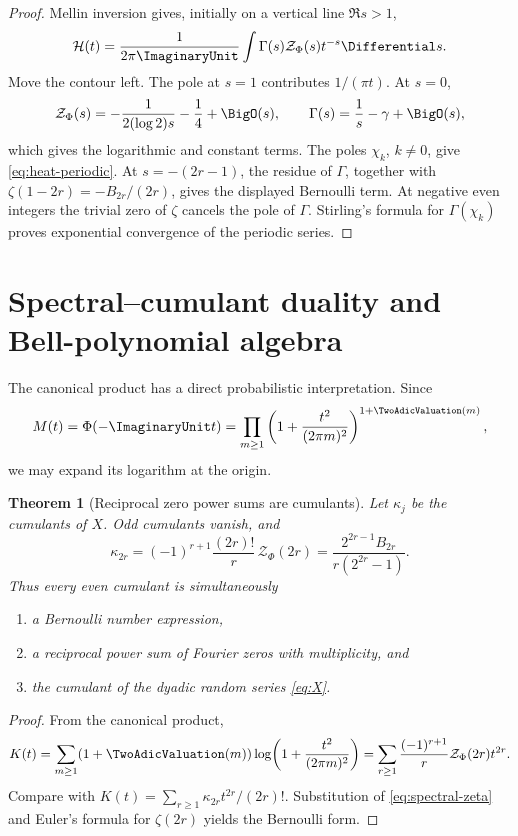 \documentclass[11pt,oneside]{article}
\newtheorem{theorem}{Theorem}[section]
\theoremstyle{definition}
\theoremstyle{remark}
\begin{document}
\begin{proof}
Mellin inversion gives, initially on a vertical line \(\Re s>1\),
\[
 \mathcal H(t)
 =\frac1{2\pi\ImaginaryUnit}\int
   \Gamma(s)\mathcal Z_\Phi(s)t^{-s}\Differential s.
\]
Move the contour left.  The pole at \(s=1\) contributes \(1/(\pi t)\).
At \(s=0\),
\[
 \mathcal Z_\Phi(s)
 =-\frac1{2(\log2)s}-\frac14+\BigO(s),
 \qquad
 \Gamma(s)=\frac1s-\gamma+\BigO(s),
\]
which gives the logarithmic and constant terms.  The poles
\(\chi_k\), \(k\neq0\), give \eqref{eq:heat-periodic}.  At
\(s=-(2r-1)\), the residue of \(\Gamma\), together with
\(\zeta(1-2r)=-B_{2r}/(2r)\), gives the displayed Bernoulli term.  At
negative even integers the trivial zero of \(\zeta\) cancels the pole of
\(\Gamma\).  Stirling's formula for \(\Gamma(\chi_k)\) proves exponential
convergence of the periodic series.
\end{proof}

\section{Spectral--cumulant duality and Bell-polynomial algebra}

The canonical product has a direct probabilistic interpretation.  Since
\[
 M(t)=\Phi(-\ImaginaryUnit t)
 =\prod_{m\geq1}
  \left(1+\frac{t^2}{(2\pi m)^2}\right)^{1+\TwoAdicValuation(m)},
\]
we may expand its logarithm at the origin.

\begin{theorem}[Reciprocal zero power sums are cumulants]
\label{thm:cumulants}
Let \(\kappa_j\) be the cumulants of \(X\).  Odd cumulants vanish, and
\begin{equation}
 \boxed{\displaystyle
 \kappa_{2r}
 =(-1)^{r+1}\frac{(2r)!}{r}\,
  \mathcal Z_\Phi(2r)
 =\frac{2^{2r-1}B_{2r}}{r(2^{2r}-1)}.}
 \label{eq:cumulants}
\end{equation}
Thus every even cumulant is simultaneously
\begin{enumerate}[label=(\roman*),leftmargin=2.5em]
\item a Bernoulli number expression,
\item a reciprocal power sum of Fourier zeros with multiplicity, and
\item the cumulant of the dyadic random series \eqref{eq:X}.
\end{enumerate}
\end{theorem}

\begin{proof}
From the canonical product,
\[
 K(t)
 =\sum_{m\geq1}(1+\TwoAdicValuation(m))
  \log\!\left(1+\frac{t^2}{(2\pi m)^2}\right)
 =\sum_{r\geq1}\frac{(-1)^{r+1}}r
   \mathcal Z_\Phi(2r)t^{2r}.
\]
Compare with
\(K(t)=\sum_{r\geq1}\kappa_{2r}t^{2r}/(2r)!\).
Substitution of \eqref{eq:spectral-zeta} and Euler's formula for
\(\zeta(2r)\) yields the Bernoulli form.
\end{proof}
\end{document}
